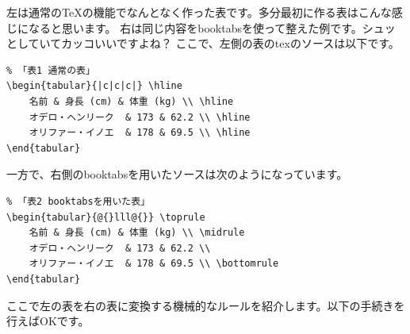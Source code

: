 \documentclass[uplatex,onecolumn,9pt,dvipdfmx]{jsarticle}
\begin{document}
左は通常のTeXの機能でなんとなく作った表です。多分最初に作る表はこんな感じになると思います。
右は同じ内容をbooktabsを使って整えた例です。シュッとしていてカッコいいですよね？
ここで、左側の表のtexのソースは以下です。 
\begin{verbatim}
% 「表1 通常の表」
\begin{tabular}{|c|c|c|} \hline
    名前 & 身長 (cm) & 体重 (kg) \\ \hline
    オデロ・ヘンリーク  & 173 & 62.2 \\ \hline 
    オリファー・イノエ  & 178 & 69.5 \\ \hline   
\end{tabular}
\end{verbatim}
一方で、右側のbooktabsを用いたソースは次のようになっています。
\begin{verbatim}
% 「表2 booktabsを用いた表」
\begin{tabular}{@{}lll@{}} \toprule
    名前 & 身長 (cm) & 体重 (kg) \\ \midrule
    オデロ・ヘンリーク  & 173 & 62.2 \\ 
    オリファー・イノエ  & 178 & 69.5 \\ \bottomrule   
\end{tabular}
\end{verbatim}
ここで左の表を右の表に変換する機械的なルールを紹介します。以下の手続きを行えばOKです。
\end{document}
